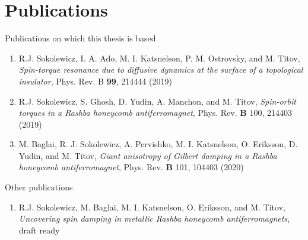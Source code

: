 \manualmark
{}%
%
%
\chapter*{Publications}%
Publications on which this thesis is based
\begin{enumerate}
    \item R.J. Sokolewicz, I. A. Ado, M. I. Katsnelson, P. M. Ostrovsky, and M. Titov, \textit{Spin-torque resonance due to diffusive dynamics at the surface of a topological insulator}, Phys. Rev. B \textbf{99}, 214444 (2019)
    \item R.J. Sokolewicz, S. Ghosh, D. Yudin, A. Manchon, and M. Titov, \textit{Spin-orbit torques in a Rashba honeycomb antiferromagnet}, Phys. Rev. \textbf{B} 100, 214403 (2019)
    \item M. Baglai, R. J. Sokolewicz, A. Pervishko, M. I. Katsnelson, O. Eriksson, D. Yudin, and M. Titov, \textit{Giant anisotropy of Gilbert damping in a Rashba honeycomb antiferromagnet}, Phys. Rev. \textbf{B} 101, 104403 (2020)
\end{enumerate}
Other publications
\begin{enumerate}
    \item R.J. Sokolewicz, M. Baglai, M. I. Katsnelson, O. Eriksson, and M. Titov, \textit{Uncovering spin damping in metallic Rashba honeycomb antiferromagnets}, draft ready
\end{enumerate}